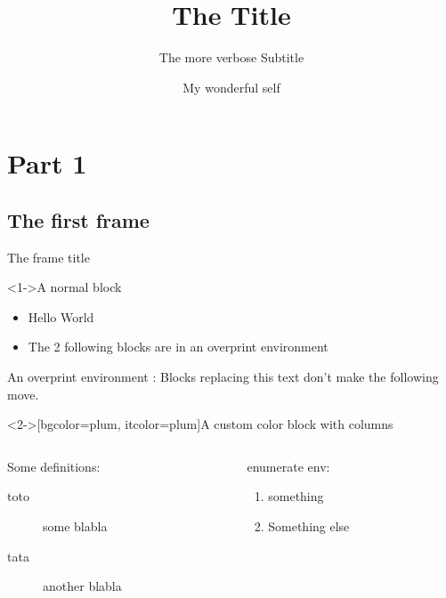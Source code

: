 \documentclass[presentation, aspectratio=169]{beamer}
\author{My wonderful self}
\date{\mydate}
\title{The Title}
\subtitle{The more verbose Subtitle}
\begin{document}
\maketitle
\section{Part 1}
\label{sec:part1}

\subsection{The first frame}
\label{sec:first_frame}

\begin{frame}{The frame title}

  \begin{block}<1->{A normal block}
    \begin{itemize}
    \item Hello World
    \item The 2 following blocks are in an overprint environment
    \end{itemize}
  \end{block}

  \begin{overprint}

    An overprint environment : Blocks replacing this text don't make the following move.
    

    \begin{customblock}<2->[bgcolor=plum, itcolor=plum]{A custom color block with columns}
      \begin{columns}
        \begin{column}{0.6\columnwidth}
          Some definitions:
          \begin{description}
          \item[{toto}] some blabla
          \item[{tata}] another blabla
          \end{description}
        \end{column}

        \begin{column}{0.3\columnwidth}
          enumerate env:
          \begin{enumerate}
          \item something
          \item Something else
          \end{enumerate}
        \end{column}
      \end{columns}
    \end{customblock}


\end{overprint}
\end{frame}
\end{document}
